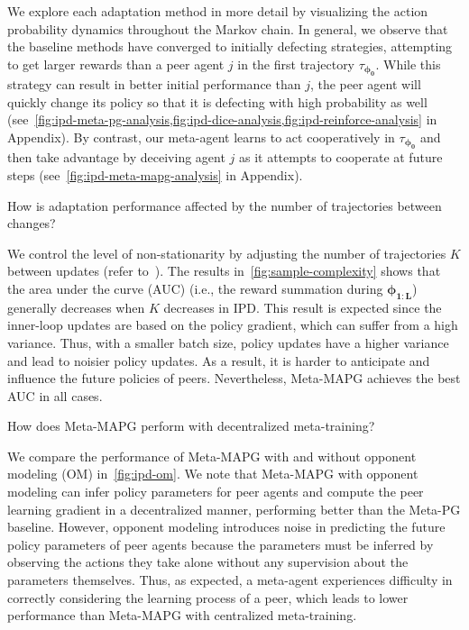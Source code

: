 We explore each adaptation method in more detail by visualizing the action probability dynamics throughout the Markov chain. In general, we observe that the baseline methods have converged to initially defecting strategies, attempting to get larger rewards than a peer agent $j$ in the first trajectory $\tau_{\bm{\phi}_{\bm{0}}}$.
While this strategy can result in better initial performance than $j$, the peer agent will quickly change its policy so that it is defecting with high probability as well (see~\cref{fig:ipd-meta-pg-analysis,fig:ipd-dice-analysis,fig:ipd-reinforce-analysis} in Appendix). 
By contrast, our meta-agent learns to act cooperatively in $\tau_{\bm{\phi}_{\bm{0}}}$ and then take advantage by deceiving agent $j$ as it attempts to cooperate at future steps (see~\cref{fig:ipd-meta-mapg-analysis} in Appendix).

\begin{question}
How is adaptation performance affected by the number of trajectories between changes? \\[-2em]
\end{question}
We control the level of non-stationarity by adjusting the number of trajectories $K$ between updates (refer to~). 
The results in~\cref{fig:sample-complexity} shows that the area under the curve (AUC) (i.e., the reward summation during $\bm{\phi}_{\bm{1:L}}$) generally decreases when $K$ decreases in IPD. 
This result is expected since the inner-loop updates are based on the policy gradient, which can suffer from a high variance. 
Thus, with a smaller batch size, policy updates have a higher variance and lead to noisier policy updates. As a result, it is harder to anticipate and influence the future policies of peers. 
Nevertheless, Meta-MAPG achieves the best AUC in all cases.

\begin{question}
How does Meta-MAPG perform with decentralized meta-training?
\\[-2em]
\end{question}
We compare the performance of Meta-MAPG with and without opponent modeling (OM) in~\cref{fig:ipd-om}.
We note that Meta-MAPG with opponent modeling can infer policy parameters for peer agents and compute the peer learning gradient in a decentralized manner, performing better than the Meta-PG baseline.
However, opponent modeling introduces noise in predicting the future policy parameters of peer agents because the parameters must be inferred by observing the actions they take alone without any supervision about the parameters themselves. 
Thus, as expected, a meta-agent experiences difficulty in correctly considering the learning process of a peer, which leads to lower performance than Meta-MAPG with centralized meta-training.


